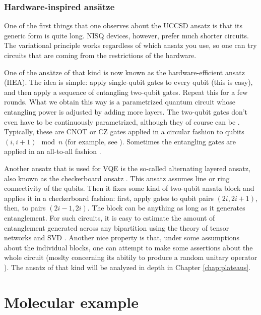 \subsubsection{Hardware-inspired ans\"atze}

One of the first things that one observes about the UCCSD ansatz is that its generic form is quite long. NISQ devices, however, prefer much shorter circuits. The variational principle works regardless of which ansatz you use, so one can try circuits that are coming from the restrictions of the hardware. 

One of the ans\"atze of that kind is now known as the hardware-efficient ansatz (HEA)\cite{kandala_hardware-efficient_2017}. The idea is simple: apply single-qubit gates to every qubit (this is easy), and then apply a sequence of entangling two-qubit gates.  Repeat this for a few rounds. What we obtain this way is a parametrized quantum circuit whose entangling power is adjusted by adding more layers. The two-qubit gates don't even have to be continuously parametrized, although they of course can be \cite{campos_abrupt_2020}. Typically, these are CNOT or CZ gates applied in a circular fashion to qubits $(i, i+1) \mod n$ (for example, see \cite{mcclean_barren_2018}). Sometimes the entangling gates are applied in an all-to-all fashion \cite{skolik_layerwise_2020}.

Another ansatz that is used for VQE is the so-called alternating layered ansatz, also known as the checkerboard ansatz \cite{uvarov_machine_2020,bravo-prieto_scaling_2020,cerezo_cost-function-dependent_2020}. This ansatz assumes line or ring connectivity of the qubits. Then it fixes some kind of two-qubit ansatz block and applies it in a checkerboard fashion: first, apply gates to qubit pairs $(2i, 2i+1)$, then, to pairs $(2i -1 , 2i)$. The block can be anything as long as it generates entanglement. For such circuits, it is easy to estimate the amount of entanglement generated across any bipartition using the theory of tensor networks and SVD \cite{biamonte_lectures_2020}. Another nice property is that, under some assumptions about the individual blocks, one can attempt to make some assertions about the whole circuit (moslty concerning its abitily to produce a random unitary operator \cite{brandao_local_2016}). The ansatz of that kind will be analyzed in depth in Chapter \ref{chap:plateaus}.



\section{Molecular example}

